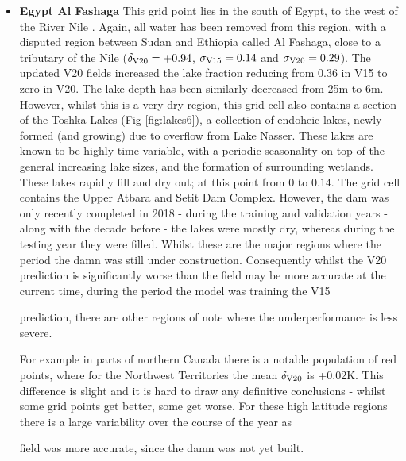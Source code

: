 \documentclass[hess, twostagejnl]{copernicus}
\providecommand{\DIFadd}[1]{{\protect\color{blue} \sf #1}} %
\providecommand{\DIFdel}[1]{{\protect\color{red} \scriptsize #1}} %
\providecommand{\DIFaddbegin}{} %
\providecommand{\DIFaddend}{} %
\providecommand{\DIFdelbegin}{} %
\providecommand{\DIFdelend}{} %
\begin{document}
\begin{itemize}
	\item \textbf{\DIFdelbegin \DIFdel{Egypt}\DIFdelend \DIFaddbegin \DIFadd{Al Fashaga}\DIFaddend } This grid point lies in \DIFdelbegin \DIFdel{the south of Egypt, to the west of the River Nile . Again, all water has been removed from this region, with }\DIFdelend \DIFaddbegin \DIFadd{a disputed region between Sudan and Ethiopia called Al Fashaga, close to a tributary of the Nile ($\delta_{\rm V20} = +0.94$, $\sigma_{\rm V15} = 0.14$ and $\sigma_{\rm V20}=0.29$). The updated V20 fields increased }\DIFaddend the lake fraction \DIFdelbegin \DIFdel{reducing from 0.36 in V15 to zero in V20. The lake depth has been similarly decreased from 25m to 6m. However, whilst this is a very dry region, this grid cell also contains a section of the Toshka Lakes (Fig \ref{fig:lakes6}), a collection of endoheic lakes, newly formed (and growing) due to overflow from Lake Nasser. These lakes are known to be highly time variable, with a periodic seasonality on top of the general increasing lake sizes, and the formation of surrounding wetlands. These lakes rapidly fill and dry out; }\DIFdelend \DIFaddbegin \DIFadd{at this point from $0$ to $0.14$. The grid cell contains the Upper Atbara and Setit Dam Complex. However, the dam was only recently completed in 2018 - }\DIFaddend during the training \DIFdelbegin \DIFdel{and validation years -  along with the decade before - the lakes were mostly dry\cite{ToshkaURL}, whereas during the testing year they were filled.
}%
\DIFdel{Whilst these are the major regions where the }\DIFdelend \DIFaddbegin \DIFadd{period the damn was still under construction. Consequently whilst the }\DIFaddend V20 \DIFdelbegin \DIFdel{prediction is significantly worse than the }\DIFdelend \DIFaddbegin \DIFadd{field may be more accurate at the current time, during the period the model was training the }\DIFaddend V15 \DIFdelbegin \DIFdel{prediction, there are other regions of note where the underperformance is less severe. 
		
For example in parts of northern Canada there is a notable population of red points, where for the Northwest Territories the mean $\delta_{\rm V20}$  is +0.02K. This difference is slight and it is hard to draw any definitive conclusions - whilst some grid points get better, some get worse. For these high latitude regions there is a large variability over the course of the year as }\DIFdelend \DIFaddbegin \DIFadd{field was more accurate, since the damn was not yet built. 
		
}
\end{itemize}
\end{document}
